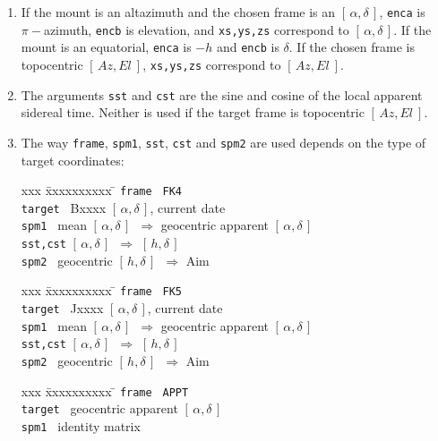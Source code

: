 \documentclass[12pt,fleqn,twoside]{article}
\renewcommand{\_}{{\tt\char'137}}     %
\newcommand{\radec}     {$[\,\alpha,\delta\,]$}
\newcommand{\hadec}     {$[\,h,\delta\,]$}
\newcommand{\azel}      {$[\,Az,El~]$}
\begin{document}
{\begin{enumerate}
      In the present case, the pointing origin is determined, starting
      from the sky target coordinates and the encoder settings.
\item If the mount is an altazimuth and the chosen frame is an
      \radec, {\tt enca} is $\pi-$azimuth, {\tt encb}
      is elevation, and {\tt xs,ys,zs}
      correspond to \radec.  If the mount is an equatorial, {\tt enca}
      is $-h$ and {\tt encb} is $\delta$.  If the chosen frame is
      topocentric \azel, {\tt xs,ys,zs} correspond to \azel.
\item The arguments {\tt sst} and {\tt cst} are the
      sine and cosine of the local
      apparent sidereal time.  Neither is used if the target frame is
      topocentric \azel.
\item The way {\tt frame}, {\tt spm1}, {\tt sst}, {\tt cst} and
      {\tt spm2} are used depends on the type of target coordinates:
      \begin{tabbing}
         xxx \= xxxxxxxxxx \= \kill
         \> {\tt frame  } \> {\tt FK4} \\
         \> {\tt target } \> Bxxxx \radec, current date \\
         \> {\tt spm1   } \>
                 mean \radec\ $\Rightarrow$ geocentric apparent \radec \\
         \> {\tt sst,cst} \> \radec\ $\Rightarrow$ \hadec \\
         \> {\tt spm2   } \>  geocentric \hadec\ $\Rightarrow$ {\sc Aim}
      \end{tabbing}
      \begin{tabbing}
         xxx \= xxxxxxxxxx \= \kill
         \> {\tt frame  } \> {\tt FK5} \\
         \> {\tt target } \> Jxxxx \radec, current date \\
         \> {\tt spm1   } \>
                 mean \radec\ $\Rightarrow$ geocentric apparent \radec \\
         \> {\tt sst,cst} \> \radec\ $\Rightarrow$ \hadec \\
         \> {\tt spm2   } \> geocentric \hadec\ $\Rightarrow$ {\sc Aim}
      \end{tabbing}
      \begin{tabbing}
         xxx \= xxxxxxxxxx \= \kill
         \> {\tt frame  } \> {\tt APPT} \\
         \> {\tt target } \> geocentric apparent \radec \\
         \> {\tt spm1   } \> identity matrix \\

\end{tabbing}
\end{enumerate}}
\end{document}
